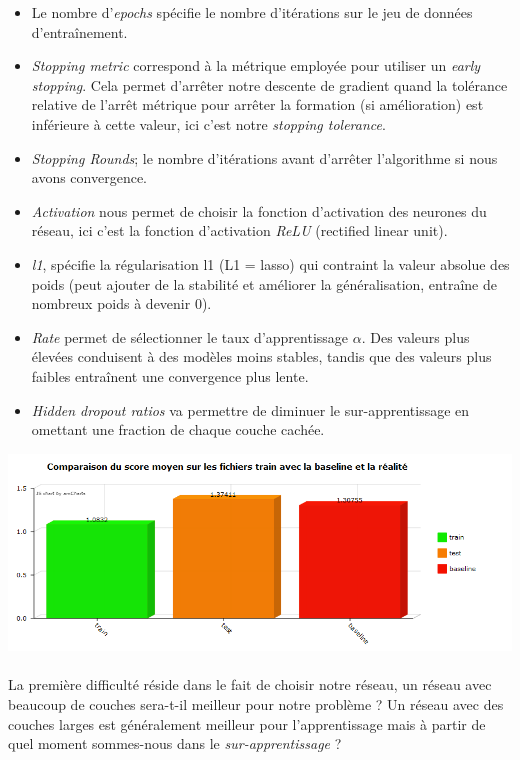 \documentclass[14pt, openany]{article}
\begin{document}
\begin{itemize}
\item Le nombre d'\textit{epochs} spécifie le nombre d'itérations sur le jeu de données d'entraînement.
\item \textit{Stopping metric} correspond à la métrique employée pour utiliser un \textit{early stopping}. Cela permet d'arrêter notre descente de gradient quand la tolérance relative de l'arrêt métrique pour arrêter la formation (si amélioration) est inférieure à cette valeur, ici c'est notre \textit{stopping tolerance}.
\item \textit{Stopping Rounds}; le nombre d'itérations avant d'arrêter l'algorithme si nous avons convergence.
\item  \textit{Activation} nous permet de choisir la fonction d'activation des neurones du réseau, ici c'est la fonction d'activation \textit{ReLU} (rectified linear unit).
\item \textit{l1}, spécifie la régularisation l1 (L1 = lasso) qui contraint la valeur absolue des poids (peut ajouter de la stabilité et améliorer la généralisation, entraîne de nombreux poids à devenir 0).
\item \textit{Rate} permet de sélectionner le taux d'apprentissage $\alpha$.  Des valeurs plus élevées conduisent à des modèles moins stables, tandis que des valeurs plus faibles entraînent une convergence plus lente.
\item \textit{Hidden dropout ratios} va permettre de diminuer le sur-apprentissage en omettant une fraction de chaque couche cachée.
\end{itemize}

\begin{center}
\includegraphics[scale=0.7]{Images/deep1h2o.png}
\end{center}

\paragraph{}
La première difficulté réside dans le fait de choisir notre réseau, un réseau avec beaucoup de couches sera-t-il meilleur pour notre problème ? Un réseau avec des couches larges est généralement meilleur pour l'apprentissage mais à partir de quel moment sommes-nous dans le \textit{sur-apprentissage} ?
\end{document}
